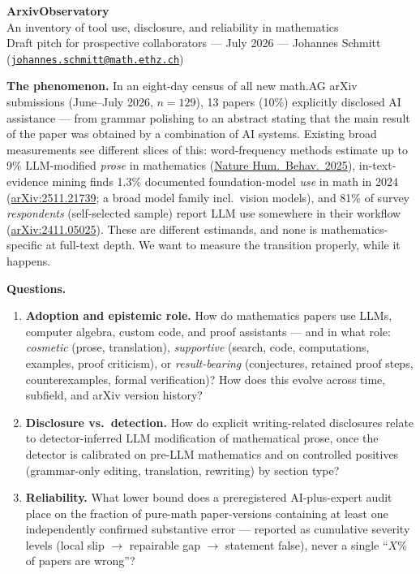 \documentclass[10pt]{article}
\newcommand{\ax}[1]{\href{https://arxiv.org/abs/#1}{\mbox{arXiv:#1}}}
\newcommand{\head}[1]{\vspace{2pt}\textbf{#1}\enspace}
\begin{document}
\begin{center}
  {\LARGE\bfseries ArxivObservatory}\\[2pt]
  {\large An inventory of tool use, disclosure, and reliability in mathematics}\\[1pt]
  {\small Draft pitch for prospective collaborators --- July 2026 --- Johannes Schmitt (\href{mailto:johannes.schmitt@math.ethz.ch}{\texttt{johannes.schmitt@math.ethz.ch}})}
\end{center}

\head{The phenomenon.}
In an eight-day census of all new \textsf{math.AG} arXiv submissions (June--July 2026, $n=129$), 13 papers (10\%) explicitly disclosed AI assistance --- from grammar polishing to an abstract stating that the main result of the paper was obtained by a combination of AI systems. Existing broad measurements see different slices of this: word-frequency methods estimate up to 9\% LLM-modified \emph{prose} in mathematics (\href{https://www.nature.com/articles/s41562-025-02273-8}{Nature Hum.\ Behav.\ 2025}), in-text-evidence mining finds 1.3\% documented foundation-model \emph{use} in math in 2024 (\ax{2511.21739}; a broad model family incl.\ vision models), and 81\% of survey \emph{respondents} (self-selected sample) report LLM use somewhere in their workflow (\ax{2411.05025}). These are different estimands, and none is mathematics-specific at full-text depth. We want to measure the transition properly, while it happens.

\head{Questions.}
\begin{enumerate}
  \item \textbf{Adoption and epistemic role.} How do mathematics papers use LLMs, computer algebra, custom code, and proof assistants --- and in what role: \emph{cosmetic} (prose, translation), \emph{supportive} (search, code, computations, examples, proof criticism), or \emph{result-bearing} (conjectures, retained proof steps, counterexamples, formal verification)? How does this evolve across time, subfield, and arXiv version history?
  \item \textbf{Disclosure vs.\ detection.} How do explicit writing-related disclosures relate to detector-inferred LLM modification of mathematical prose, once the detector is calibrated on pre-LLM mathematics and on controlled positives (grammar-only editing, translation, rewriting) by section type?
  \item \textbf{Reliability.} What lower bound does a preregistered AI-plus-expert audit place on the fraction of pure-math paper-versions containing at least one independently confirmed substantive error --- reported as cumulative severity levels (local slip $\to$ repairable gap $\to$ statement false), never a single ``$X$\% of papers are wrong''?
\end{enumerate}
\end{document}
